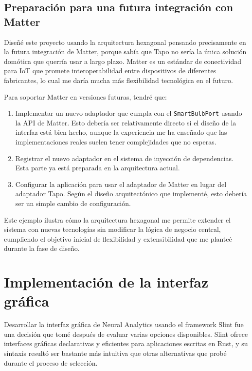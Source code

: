 \newpage
\subsection{Preparación para una futura integración con Matter}

Diseñé este proyecto usando la arquitectura hexagonal pensando precisamente en la futura integración de Matter, porque sabía que Tapo no sería la única solución domótica que querría usar a largo plazo. Matter es un estándar de conectividad para IoT que promete interoperabilidad entre dispositivos de diferentes fabricantes, lo cual me daría mucha más flexibilidad tecnológica en el futuro.

Para soportar Matter en versiones futuras, tendré que:

\begin{enumerate}
    \item Implementar un nuevo adaptador que cumpla con el \texttt{SmartBulbPort} usando la API de Matter. Esto debería ser relativamente directo si el diseño de la interfaz está bien hecho, aunque la experiencia me ha enseñado que las implementaciones reales suelen tener complejidades que no esperas.
    \item Registrar el nuevo adaptador en el sistema de inyección de dependencias. Esta parte ya está preparada en la arquitectura actual.
    \item Configurar la aplicación para usar el adaptador de Matter en lugar del adaptador Tapo. Según el diseño arquitectónico que implementé, esto debería ser un simple cambio de configuración.
\end{enumerate}

Este ejemplo ilustra cómo la arquitectura hexagonal me permite extender el sistema con nuevas tecnologías sin modificar la lógica de negocio central, cumpliendo el objetivo inicial de flexibilidad y extensibilidad que me planteé durante la fase de diseño.

\section{Implementación de la interfaz gráfica}

Desarrollar la interfaz gráfica de Neural Analytics usando el framework Slint fue una decisión que tomé después de evaluar varias opciones disponibles. Slint ofrece interfaces gráficas declarativas y eficientes para aplicaciones escritas en Rust, y su sintaxis resultó ser bastante más intuitiva que otras alternativas que probé durante el proceso de selección.

